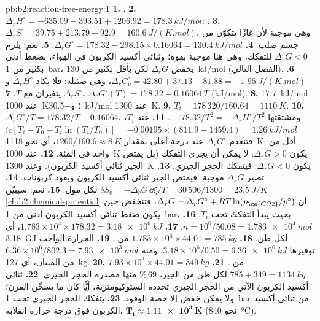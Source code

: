 \begin{solution}{pb:b2:reaction-free-energy:1}
\textbf{1.} .
\textbf{2.} $\Delta_r H^\circ = -635.09 - 393.51 + 1206.92 =
\qty{+178.3}{kJ/mol}$: .
\textbf{3.} $\Delta_r S^\circ = 39.75 + 213.79 - 92.9 = \qty{+160.6}{J/(K.mol)}$،
وهي موجبة لأن غازًا يتكوّن من جسم صلب.
\textbf{4.} $\Delta_r G^\circ = 178.32 - 298.15 \times 0.16064 =
\qty{+130.4}{kJ/mol}$.
\textbf{5.} نعم: يلزم $\Delta_r G < 0$ للتفكك، وهي هنا موجبة بقوة؛ وثنائي
أكسيد الكربون في الهواء، بضغط أدنى بكثير من \qty{1}{bar}،
يخفض $\Delta_r G$ لكن بأقل بكثير من \qty{130}{kJ/mol} (الفصل التالي).
\textbf{6.} $\Delta_r C^\circ_p = 42.80 + 37.13 - 81.88 =
\qty{-1.95}{J/(K.mol)}$، وهي ضئيلة: فلا يكاد $\Delta_r H^\circ$ و$\Delta_r S^\circ$
يتغيران مع $T$.
\textbf{7.} $\Delta_r G^\circ(T) = 178.32 - 0.16064\,T$ (\unit{kJ/mol}).
\textbf{8.} \qty{+17.7}{kJ/mol} عند \qty{1000}{K}؛ و\qty{-30.5}{kJ/mol} عند
\qty{1300}{K}.
\textbf{9.} $T_i = 178\,320/160.64 = \qty{1110}{K}$.
\textbf{10.} $\Delta_r G^\circ/T = 178.32/T - 0.16064$، ومشتقتها
$-178.32/T^2 = -\Delta_r H^\circ/T^2$.
\textbf{11.} عند $T_i$، $c[T_i - T_0 - T_i\ln(T_i/T_0)] = -0.00195 \times
(811.9 - 1459.4) = \qty{+1.26}{kJ/mol}$؛ فتنعدم $\Delta_r G^\circ$
عند درجة أعلى بمقدار $1260/160.6 \approx \qty{8}{K}$، أي نحو \qty{1118}{K}: أقل من
واحد في المئة.
\textbf{12.} عند \qty{1000}{K} يكون $\Delta_r G > 0$: لا يمكن أن يجري التفكك
(بل يمتص الجير ثنائي أكسيد الكربون). وعند \qty{1300}{K} يكون $\Delta_r G <
0$: فيتفكك الحجر الجيري.
\textbf{13.} تصير $\Delta_r G$ موجبة: فيمتص الجير ثنائي أكسيد الكربون
ويعود كربونات.
\textbf{14.} $\delta S_{\text{c}} = -\Delta_r G\,\dd\xi/T = 30\,506/1300 =
\qty{23.5}{J/K}$ لكل مول.
\textbf{15.} نعم: سيبيّن \cref{ch:b2:chemical-potential} أن
$\Delta_r G = \Delta_r G^\circ + RT\ln(p_{\ce{CO2}}/p^\circ)$، فتنخفض
حين يكون ضغط ثنائي أكسيد الكربون أدنى من \qty{1}{bar}، بحيث يبدأ
التفكك تحت $T_i$.
\textbf{16.} $n = 10^6/56.08 = \qty{1.783e4}{mol}$.
\textbf{17.} $1.783 \times 10^4 \times 178.32 = \qty{3.18e6}{kJ}$، أي
\qty{3.18}{GJ} لكل طن.
\textbf{18.} $1.783 \times 10^4 \times 44.01 = \qty{785}{kg}$ من .
\textbf{19.} الحرارة الواجب توفيرها $3.18 \times 10^6/0.50 = \qty{6.36e6}{kJ}$، ومنه
$6.36 \times 10^6/802.3 = \qty{7.93e3}{mol}$ من الميثان، أي \qty{127}{kg}.
\textbf{20.} $7.93 \times 10^3 \times 44.01 = \qty{349}{kg}$ من .
\textbf{21.} $785 + 349 = \qty{1134}{kg}$ لكل طن من الجير، 69\,\% منها
مصدره الحجر الجيري.
\textbf{22.} ثنائي أكسيد الكربون الآتي من الحجر الجيري تحدده الستوكيومترية،
أيًّا كان ما يسخّن الفرن؛ ولا يمكن خفض إلا حصة الوقود.
\textbf{23.} يتفكك الحجر الجيري تحت \qty{1}{bar} من ثنائي أكسيد الكربون فوق
درجة حرارة انقلابه، $\boldsymbol{T_i \approx \qty{1.11e3}{K}}$
(نحو \qty{840}{\celsius}).
\end{solution}
